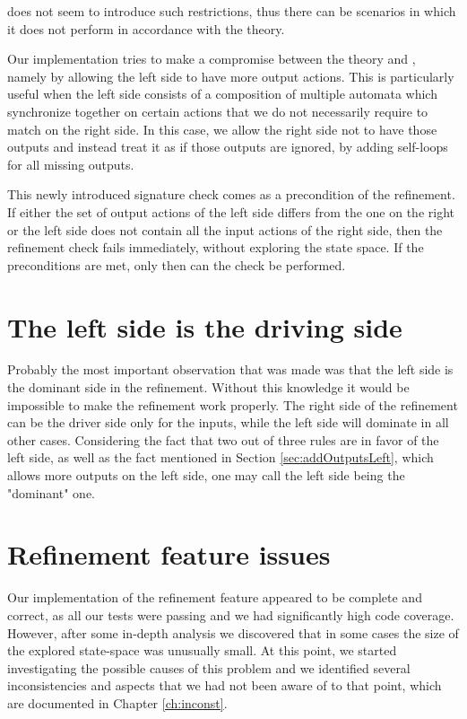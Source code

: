 \ecdar does not seem to introduce such restrictions, thus there can be scenarios in which it does not perform in accordance with the theory.

Our implementation tries to make a compromise between the theory and \ecdar, namely by allowing the left side to have more output actions. This is particularly useful when the left side consists of a composition of multiple automata which synchronize together on certain actions that we do not necessarily require to match on the right side. In this case, we allow the right side not to have those outputs and instead treat it as if those outputs are ignored, by adding self-loops for all missing outputs.

This newly introduced signature check comes as a precondition of the refinement. If either the set of output actions of the left side differs from the one on the right or the left side does not contain all the input actions of the right side, then the refinement check fails immediately, without exploring the state space. If the preconditions are met, only then can the check be performed.

\section{The left side is the driving side}\label{sec:leftDominant}
Probably the most important observation that was made was that the left side is the dominant side in the refinement. Without this knowledge it would be impossible to make the refinement work properly. The right side of the refinement can be the driver side only for the inputs, while the left side will dominate in all other cases. Considering the fact that two out of three rules are in favor of the left side, as well as the fact mentioned in Section \ref{sec:addOutputsLeft}, which allows more outputs on the left side, one may call the left side being the "dominant" one.

\section{Refinement feature issues}
Our implementation of the refinement feature appeared to be complete and correct, as all our tests were passing and we had significantly high code coverage. However, after some in-depth analysis we discovered that in some cases the size of the explored state-space was unusually small. At this point, we started investigating the possible causes of this problem and we identified several inconsistencies and aspects that we had not been aware of to that point, which are documented in Chapter \ref{ch:inconst}.

